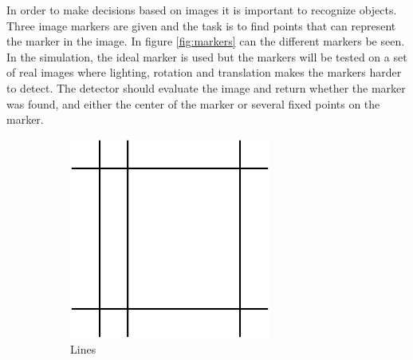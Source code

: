 In order to make decisions based on images it is important to recognize objects.
Three image markers are given and the task is to find points that can represent the marker in the image.
In figure \ref{fig:markers} can the different markers be seen.
In the simulation, the ideal marker is used but the markers will be tested on a set of real images where lighting, rotation and translation makes the markers harder to detect.
The detector should evaluate the image and return whether the marker was found, and either the center of the marker or several fixed points on the marker.


\begin{figure}[h]
\centering
 \begin{subfigure}[b]{0.3\linewidth}
 \centering
 \includegraphics[width=\linewidth]{graphics/Marker2a}
 \caption{Lines}
 \label{marker:cross}
 \end{subfigure}~
 \begin{subfigure}[b]{0.3\linewidth}
 \centering

\end{subfigure}
\end{figure}
